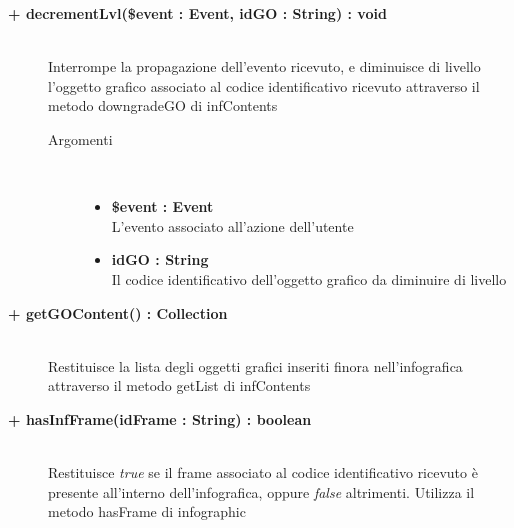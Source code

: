 \begin{description}
\begin{description}
\begin{description}
\begin{itemize}
				\end{itemize}
			
		\end{description}
	\end{description}
	
	\begin{description}
		\item[\textbf{\color{blue} + decrementLvl(\$event : Event, idGO : String) : void		}] \hfill \\
			Interrompe la propagazione dell'evento ricevuto, e diminuisce di livello l'oggetto grafico associato al codice identificativo ricevuto attraverso il metodo downgradeGO di infContents
			
		\begin{description}
			\item[Argomenti] \hfill \\
				\begin{itemize}
				
					\item \textbf{\$event : Event		} \hfill \\
					L'evento associato all'azione dell'utente
					\item \textbf{idGO : String		} \hfill \\
					Il codice identificativo dell'oggetto grafico da diminuire di livello
					
				\end{itemize}
			
		\end{description}
	\end{description}
	
	\begin{description}
		\item[\textbf{\color{blue}+ getGOContent() : Collection		}] \hfill \\
			Restituisce la lista degli oggetti grafici inseriti finora nell'infografica attraverso il metodo getList di infContents
			
	\end{description}
	
	\begin{description}
		\item[\textbf{\color{blue} + hasInfFrame(idFrame : String) : boolean		}] \hfill \\
			Restituisce \textit{true} se il frame associato al codice identificativo ricevuto è presente all'interno dell'infografica, oppure \textit{false} altrimenti. Utilizza il metodo hasFrame di infographic
			

\end{description}
\end{description}
